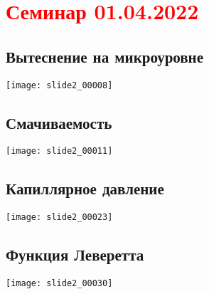 \documentclass[main.tex]{subfiles}
\begin{document}
\section{\textcolor{red}{Семинар 01.04.2022}}

\subsection{Вытеснение на микроуровне}

\texttt{[image: slide2\_00008]}


\subsection{Смачиваемость}

\texttt{[image: slide2\_00011]}










\subsection{Капиллярное давление}

\texttt{[image: slide2\_00023]}







\subsection{Функция Леверетта}

\texttt{[image: slide2\_00030]}
\end{document}
